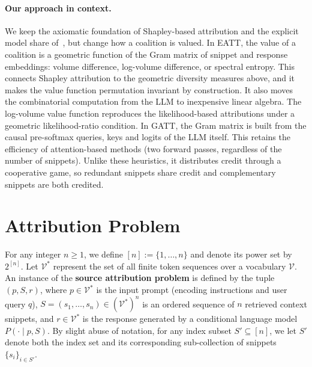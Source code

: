 \documentclass{article}
\begin{document}
\paragraph{Our approach in context.}
We keep the axiomatic foundation of Shapley-based attribution and the explicit model share of~\cite{nematov2025source}, but change how a coalition is valued. In EATT, the value of a coalition is a geometric function of the Gram matrix of snippet and response embeddings: volume difference, log-volume difference, or spectral entropy. This connects Shapley attribution to the geometric diversity measures above, and it makes the value function permutation invariant by construction. It also moves the combinatorial computation from the LLM to inexpensive linear algebra. The log-volume value function reproduces the likelihood-based attributions under a geometric likelihood-ratio condition. In GATT, the Gram matrix is built from the causal pre-softmax queries, keys and logits of the LLM itself. This retains the efficiency of attention-based methods (two forward passes, regardless of the number of snippets). Unlike these heuristics, it distributes credit through a cooperative game, so redundant snippets share credit and complementary snippets are both credited.



\section{Attribution Problem}
\label{sec:problem_formulation}

For any integer $n \ge 1$, we define $[n] := \{1, \dots, n\}$ and denote its power set by $2^{[n]}$. Let $\mathcal{V}^*$ represent the set of all finite token sequences over a vocabulary $\mathcal{V}$. An instance of the \textbf{source attribution problem} is defined by the tuple $(p, S, r)$, where $p \in \mathcal{V}^*$ is the input prompt (encoding instructions and user query $q$), $S = (s_1, \dots, s_n) \in (\mathcal{V}^*)^n$ is an ordered sequence of $n$ retrieved context snippets, and $r \in \mathcal{V}^*$ is the response generated by a conditional language model $P(\cdot \mid p, S)$. By slight abuse of notation, for any index subset $S' \subseteq [n]$, we let $S'$ denote both the index set and its corresponding sub-collection of snippets $\{s_i\}_{i \in S'}$.
\end{document}
